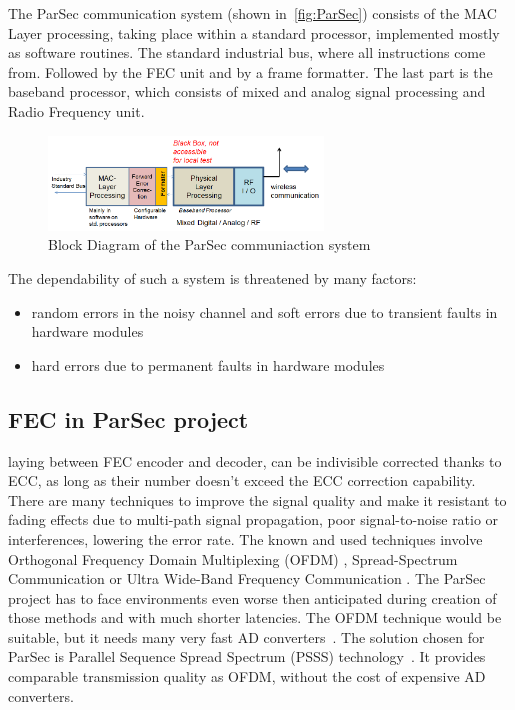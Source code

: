 The ParSec communication system (shown in~\autoref{fig:ParSec}) consists of the MAC Layer processing, taking place within a standard processor, implemented mostly as software routines. The standard industrial bus, where all instructions come from. Followed by the FEC unit and by a frame formatter. The last part is the baseband processor, which consists of mixed and analog signal processing and Radio Frequency unit. 

\begin{figure}[h]
\centering
\includegraphics[width=0.65\textwidth]{figures/ParSec.png}
\caption{Block Diagram of the ParSec communiaction system}
\label{fig:ParSec}
\end{figure}

The dependability of such a system is threatened by many factors:
\begin{itemize}
    \item random errors in the noisy channel and soft errors due to transient faults in hardware modules
    \item hard errors due to permanent faults in hardware modules
\end{itemize}

\subsection{FEC in ParSec project}
laying between FEC encoder and decoder, can be indivisible corrected thanks to ECC, as long as their number doesn't exceed the ECC correction capability\cite{source}. There are many techniques to improve the signal quality and make it resistant to fading effects due to multi-path signal propagation, poor signal-to-noise ratio or interferences, lowering the error rate. The known and used techniques involve Orthogonal Frequency Domain Multiplexing (OFDM) \cite{book:OFDM,art:OFDM}, Spread-Spectrum Communication \cite{art:spread-spectrum96,art:spread-spectrum97} or Ultra Wide-Band Frequency Communication \cite{book:ultra-wide08,book:ultra-wide04}. The ParSec project has to face environments even worse then anticipated during creation of those methods and with much shorter latencies. The OFDM technique would be suitable, but it needs many very fast AD converters~\cite{art:PSSS04}. The solution chosen for ParSec is Parallel Sequence Spread Spectrum (PSSS) technology~\cite{art:PSSS15,art:PSSS04,patent}. It provides comparable transmission quality as OFDM, without the cost of expensive AD converters.

